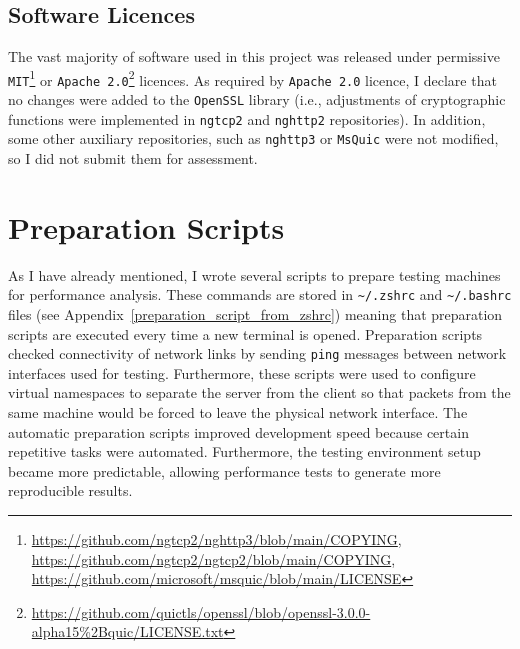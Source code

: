 \documentclass[12pt,a4paper,twoside,openright]{report}
\newcommand\note[2]{{\color{#1}\bf #2}}
\newcommand\simon[1]{\ifcomments{\note{cyan}{SM: #1}}\fi}
\begin{document}
\subsection{Software Licences} 
The vast majority of software used in this project was released under permissive \texttt{MIT}\footnote{\url{https://github.com/ngtcp2/nghttp3/blob/main/COPYING}, \\  \url{https://github.com/ngtcp2/ngtcp2/blob/main/COPYING}, \\
\url{https://github.com/microsoft/msquic/blob/main/LICENSE}} or \texttt{Apache 2.0}\footnote{\url{https://github.com/quictls/openssl/blob/openssl-3.0.0-alpha15\%2Bquic/LICENSE.txt}} licences.
As required by \texttt{Apache 2.0} licence, I declare that no changes were added to the \texttt{OpenSSL} library (i.e., adjustments of cryptographic functions were implemented in \texttt{ngtcp2} and \texttt{nghttp2} repositories).
In addition, some other auxiliary repositories, such as \texttt{nghttp3} or \texttt{MsQuic} were not modified, so I did not submit them for assessment.
























\section{Preparation Scripts}
As I have already mentioned, I wrote several scripts to prepare testing machines for performance analysis.
These commands are stored in \texttt{\textasciitilde/.zshrc} and \texttt{\textasciitilde/.bashrc} files (see Appendix~\ref{preparation_script_from_zshrc}) meaning that preparation scripts are executed every time a new terminal is opened.
Preparation scripts checked connectivity of network links by sending \texttt{ping} messages between network interfaces used for testing.
Furthermore, these scripts were used to configure virtual namespaces to separate the server from the client so that packets from the same machine would be forced to leave the physical network interface.
The automatic preparation scripts improved development speed because certain repetitive tasks were automated.
Furthermore, the testing environment setup became more predictable, allowing performance tests to generate more reproducible results.
\end{document}
